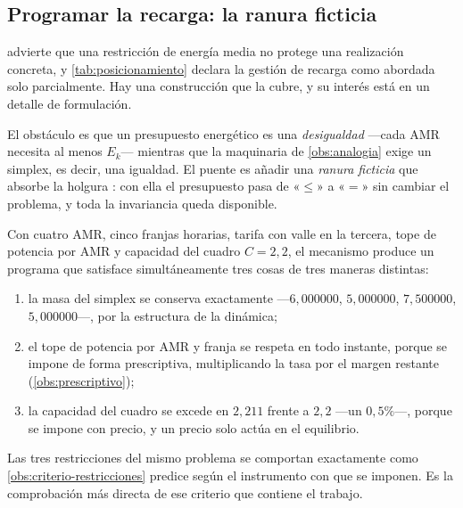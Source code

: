 \subsection{Programar la recarga: la ranura ficticia}

 advierte que una restricción de energía media no protege
una realización concreta, y \cref{tab:posicionamiento} declara la gestión de
recarga como abordada solo parcialmente. Hay una construcción que la cubre, y su
interés está en un detalle de formulación.

El obstáculo es que un presupuesto energético es una \emph{desigualdad} —cada AMR
necesita al menos $E_k$— mientras que la maquinaria de \cref{obs:analogia} exige
un simplex, es decir, una igualdad. El puente es añadir una \emph{ranura
ficticia} que absorbe la holgura \cite{martinezPiazuelo2025gne}: con ella el
presupuesto pasa de «$\le$» a «$=$» sin cambiar el problema, y toda la
invariancia queda disponible.

\begin{observacion}
\label{obs:recarga}
Con cuatro AMR, cinco franjas horarias, tarifa con valle en la tercera, tope de
potencia por AMR y capacidad del cuadro $C=2{,}2$, el mecanismo produce un
programa que satisface simultáneamente tres cosas de tres maneras distintas:
\begin{enumerate}[label=(\roman*),leftmargin=2.2em,topsep=0.2em,itemsep=0.15em]
  \item la masa del simplex se conserva exactamente —$6{,}000000$, $5{,}000000$,
  $7{,}500000$, $5{,}000000$—, por la estructura de la dinámica;
  \item el tope de potencia por AMR y franja se respeta en todo instante, porque
  se impone de forma prescriptiva, multiplicando la tasa por el margen restante
  (\cref{obs:prescriptivo});
  \item la capacidad del cuadro se excede en $2{,}211$ frente a $2{,}2$ —un
  $0{,}5\%$—, porque se impone con precio, y un precio solo actúa en el
  equilibrio.
\end{enumerate}
Las tres restricciones del mismo problema se comportan exactamente como
\cref{obs:criterio-restricciones} predice según el instrumento con que se
imponen. Es la comprobación más directa de ese criterio que contiene el trabajo.
\end{observacion}

